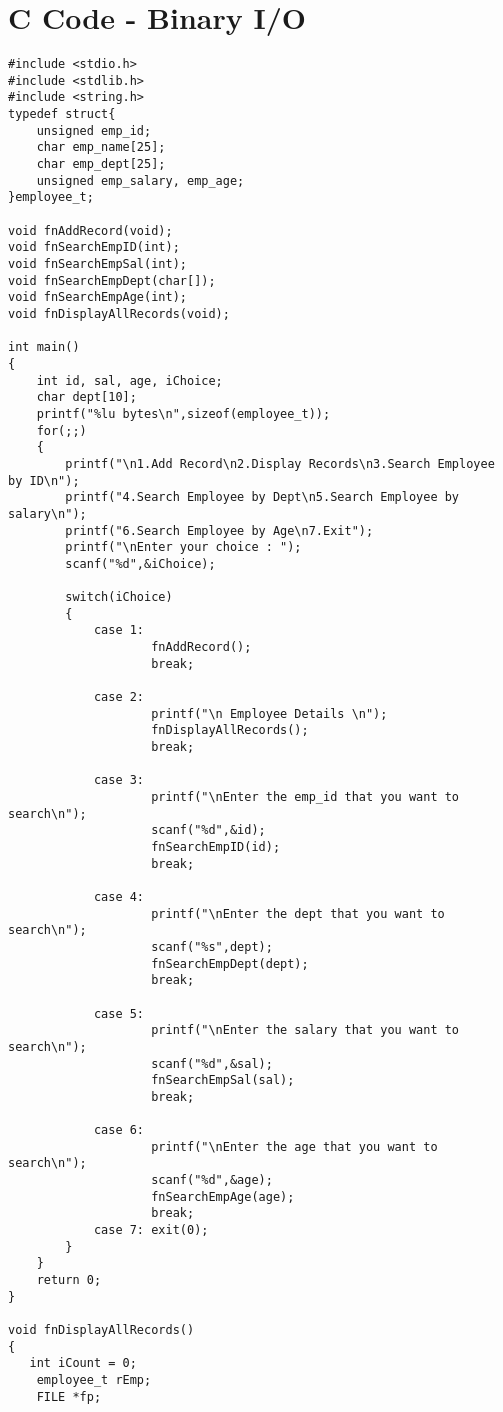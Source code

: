 \section*{C Code - Binary I/O}

\begin{Verbatim}
#include <stdio.h>
#include <stdlib.h>
#include <string.h>
typedef struct{
    unsigned emp_id;
    char emp_name[25];
    char emp_dept[25];
    unsigned emp_salary, emp_age;
}employee_t;

void fnAddRecord(void);
void fnSearchEmpID(int);
void fnSearchEmpSal(int);
void fnSearchEmpDept(char[]);
void fnSearchEmpAge(int);
void fnDisplayAllRecords(void);

int main()
{
    int id, sal, age, iChoice;
	char dept[10];
	printf("%lu bytes\n",sizeof(employee_t));
	for(;;)
	{
	    printf("\n1.Add Record\n2.Display Records\n3.Search Employee by ID\n");
	    printf("4.Search Employee by Dept\n5.Search Employee by salary\n");
	    printf("6.Search Employee by Age\n7.Exit");
	    printf("\nEnter your choice : ");
	    scanf("%d",&iChoice);

	    switch(iChoice)
	    {
            case 1:
                    fnAddRecord();
                    break;

            case 2:
                    printf("\n Employee Details \n");
                    fnDisplayAllRecords();
                    break;

            case 3:
                    printf("\nEnter the emp_id that you want to search\n");
                    scanf("%d",&id);
                    fnSearchEmpID(id);
                    break;

            case 4:
                    printf("\nEnter the dept that you want to search\n");
                    scanf("%s",dept);
                    fnSearchEmpDept(dept);
                    break;

            case 5:
                    printf("\nEnter the salary that you want to search\n");
                    scanf("%d",&sal);
                    fnSearchEmpSal(sal);
                    break;

            case 6:
                    printf("\nEnter the age that you want to search\n");
                    scanf("%d",&age);
                    fnSearchEmpAge(age);
                    break;
            case 7: exit(0);
	    }
	}
    return 0;
}

void fnDisplayAllRecords()
{
   int iCount = 0;
	employee_t rEmp;
	FILE *fp;


\end{Verbatim}

